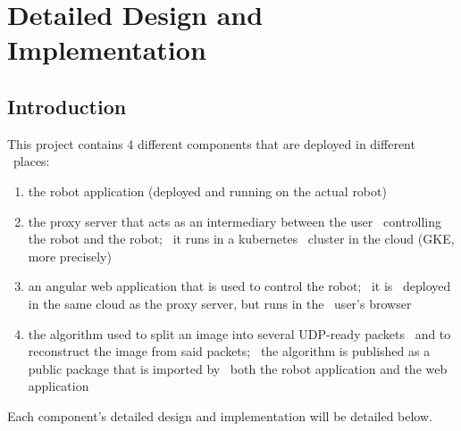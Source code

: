 \chapter{Detailed Design and Implementation}
\label{ch:implementation}



\section{Introduction}
\label{sec:implementation-introduction}
This project contains 4 different components that are deployed in different \
places:
\begin{enumerate}
    \item the robot application (deployed and running on the actual robot)
    \item the proxy server that acts as an intermediary between the user \
            controlling the robot and the robot; \
            it runs in a kubernetes \
            cluster in the cloud (GKE, more precisely)
    \item an angular web application that is used to control the robot; \
            it is \
            deployed in the same cloud as the proxy server, but runs in the \
            user's browser
    \item the algorithm used to split an image into several UDP-ready packets \
            and to reconstruct the image from said packets; \
            the algorithm is published as a public package that is imported by \
            both the robot application and the web application
\end{enumerate}

Each component's detailed design and implementation will be detailed below.

%
%
